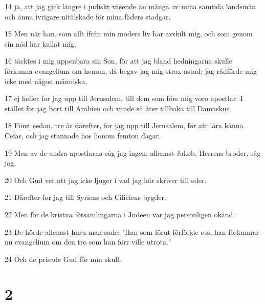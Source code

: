 \par 14 ja, att jag gick längre i judiskt väsende än många av mina samtida landsmän och ännu ivrigare nitälskade för mina fäders stadgar.
\par 15 Men när han, som allt ifrån min moders liv har avskilt mig, och som genom sin nåd har kallat mig,
\par 16 täcktes i mig uppenbara sin Son, för att jag bland hedningarna skulle förkunna evangelium om honom, då begav jag mig strax åstad; jag rådförde mig icke med någon människa,
\par 17 ej heller for jag upp till Jerusalem, till dem som före mig voro apostlar. I stället for jag bort till Arabien och vände så åter tillbaka till Damaskus.
\par 18 Först sedan, tre år därefter, for jag upp till Jerusalem, för att lära känna Cefas, och jag stannade hos honom femton dagar.
\par 19 Men av de andra apostlarna såg jag ingen; allenast Jakob, Herrens broder, såg jag.
\par 20 Och Gud vet att jag icke ljuger i vad jag här skriver till eder.
\par 21 Därefter for jag till Syriens och Ciliciens bygder.
\par 22 Men för de kristna församlingarna i Judeen var jag personligen okänd.
\par 23 De hörde allenast huru man sade: "Han som förut förföljde oss, han förkunnar nu evangelium om den tro som han förr ville utrota."
\par 24 Och de prisade Gud för min skull.

\chapter{2}

